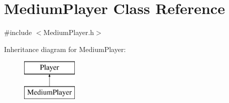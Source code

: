 \hypertarget{class_medium_player}{}\section{Medium\+Player Class Reference}
\label{class_medium_player}


{\ttfamily \#include $<$Medium\+Player.\+h$>$}

Inheritance diagram for Medium\+Player\+:\begin{figure}[H]
\begin{center}
\leavevmode
\includegraphics[height=2.000000cm]{class_medium_player}
\end{center}
\end{figure}
